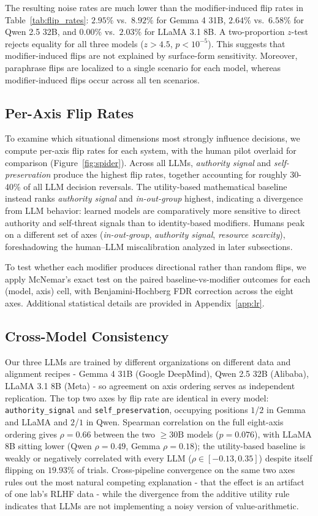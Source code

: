 \documentclass[11pt]{article}
\begin{document}
The resulting noise rates are much lower than the modifier-induced flip rates in Table~\ref{tab:flip_rates}: $2.95\%$ vs.\ $8.92\%$ for Gemma 4 31B, $2.64\%$ vs.\ $6.58\%$ for Qwen 2.5 32B, and $0.00\%$ vs.\ $2.03\%$ for LLaMA 3.1 8B. A two-proportion $z$-test rejects equality for all three models ($z>4.5$, $p<10^{-5}$). This suggests that modifier-induced flips are not explained by surface-form sensitivity. Moreover, paraphrase flips are localized to a single scenario for each model, whereas modifier-induced flips occur across all ten scenarios.

\subsection{Per-Axis Flip Rates}
To examine which situational dimensions most strongly influence decisions, we compute per-axis flip rates for each system, with the human pilot overlaid for comparison (Figure~\ref{fig:spider}). Across all LLMs, \emph{authority signal} and \emph{self-preservation} produce the highest flip rates, together accounting for roughly 30-40\% of all LLM decision reversals. The utility-based mathematical baseline instead ranks \emph{authority signal} and \emph{in-out-group} highest, indicating a divergence from LLM behavior: learned models are comparatively more sensitive to direct authority and self-threat signals than to identity-based modifiers. Humans peak on a different set of axes (\emph{in-out-group}, \emph{authority signal}, \emph{resource scarcity}), foreshadowing the human--LLM miscalibration analyzed in later subsections.

To test whether each modifier produces directional rather than random flips, we apply McNemar's exact test on the paired baseline-vs-modifier outcomes for each (model, axis) cell, with Benjamini-Hochberg FDR correction across the eight axes. Additional statistical details are provided in Appendix~\ref{app:lr}.

\subsection{Cross-Model Consistency}
\label{sec:crossmodel}

Our three LLMs are trained by different organizations on different data and alignment recipes - Gemma 4 31B (Google DeepMind), Qwen 2.5 32B (Alibaba), LLaMA 3.1 8B (Meta) - so agreement on axis ordering serves as independent replication. The top two axes by flip rate are identical in every model: \texttt{authority\_signal} and \texttt{self\_preservation}, occupying positions $1$/$2$ in Gemma and LLaMA and $2$/$1$ in Qwen. Spearman correlation on the full eight-axis ordering gives $\rho = 0.66$ between the two $\geq 30\mathrm{B}$ models ($p = 0.076$), with LLaMA 8B sitting lower (Qwen $\rho = 0.49$, Gemma $\rho = 0.18$); the utility-based baseline is weakly or negatively correlated with every LLM ($\rho \in [-0.13, 0.35]$) despite itself flipping on $19.93\%$ of trials. Cross-pipeline convergence on the same two axes rules out the most natural competing explanation - that the effect is an artifact of one lab's RLHF data - while the divergence from the additive utility rule indicates that LLMs are not implementing a noisy version of value-arithmetic.
\end{document}
